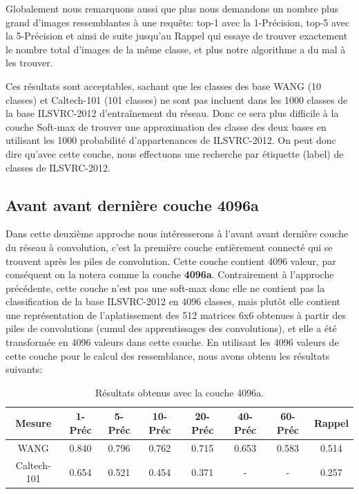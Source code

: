 	Globalement nous remarquons aussi que plus nous demandons un nombre plus grand d'images ressemblantes à une requête: top-1 avec la 1-Précision, top-5 avec la 5-Précision et ainsi de suite jusqu'au Rappel qui essaye de trouver exactement le nombre total d'images de la même classe, et plus notre algorithme a du mal à les trouver.

	Ces résultats sont acceptables, sachant que les classes des base WANG (10 classes) et Caltech-101 (101 classes) ne sont pas incluent dans les 1000 classes de la base ILSVRC-2012 d’entraînement du réseau. Donc ce sera plus difficile à la couche Soft-max de trouver une approximation des classe des deux bases en utilisant les 1000 probabilité d'appartenances de ILSVRC-2012.
	On peut donc dire qu'avec cette couche, nous effectuons une recherche par étiquette (label) de classes de ILSVRC-2012. 





\subsection{Avant avant dernière couche 4096a} 
	Dans cette deuxième approche nous intéresserons à l'avant avant dernière couche du réseau à convolution, c'est la première couche entièrement connecté qui se trouvent après les piles de convolution. Cette couche contient 4096 valeur, par conséquent on la notera comme la couche \textbf{4096a}.
	Contrairement à l'approche précédente, cette couche n'est pas une soft-max donc elle ne contient pas la classification de la base ILSVRC-2012 en 4096 classes, mais plutôt elle contient une représentation de l’aplatissement des 512 matrices 6x6 obtenues à partir des piles de convolutions (cumul des apprentissages des convolutions), et elle a été transformée en 4096 valeurs dans cette couche. En utilisant les 4096 valeurs de cette couche pour le calcul des ressemblance, nous avons obtenu les résultats suivants:

\begin{table}[H]
\begin{center}
\begin{tabular}{|c|c|c|c|c|c|c|c|}
\hline
	Mesure & 1-Préc & 5-Préc & 10-Préc & 20-Préc & 40-Préc & 60-Préc & Rappel\\
\hline
	WANG & 0.840 & 0.796 & 0.762 & 0.715 & 0.653 & 0.583 & 0.514\\
\hline
	Caltech-101 & 0.654 & 0.521 & 0.454 & 0.371 & - & - & 0.257\\
\hline
\end{tabular}
\end{center}
\caption{Résultats obtenus avec la couche 4096a.}
\end{table}

